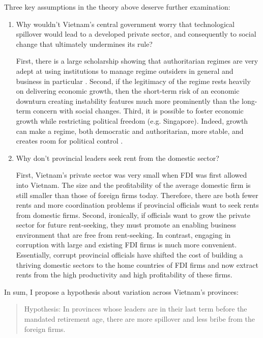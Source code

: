 Three key assumptions in the theory above deserve further examination:
\begin{enumerate}
\item Why wouldn't Vietnam's central government worry that technological spillover would lead to a developed private sector, and consequently to social change that ultimately undermines its rule?

First, there is a large scholarship showing that authoritarian regimes are very adept at using institutions to manage regime outsiders in general and business in particular \citep{Gandhi2006, Gandhi2008, Wright2008, Le2015}. Second, if the legitimacy of the regime rests heavily on delivering economic growth, then the short-term risk of an economic downturn creating instability features much more prominently than the long-term concern with social changes. Third, it is possible to foster economic growth while restricting political freedom (e.g. Singapore). Indeed, growth can make a regime, both democratic and authoritarian, more stable, and creates room for political control \citep{Przeworski1997}.

\item Why don't provincial leaders seek rent from the domestic sector? 

First, Vietnam's private sector was very small when FDI was first allowed into Vietnam. The size and the profitability of the average domestic firm is still smaller than those of foreign firms today. Therefore, there are both fewer rents and more coordination problems if provincial officials want to seek rents from domestic firms. Second, ironically, if officials want to grow the private sector for future rent-seeking, they must promote an enabling business environment that are free from rent-seeking. In contrast, engaging in corruption with large and existing FDI firms is much more convenient. Essentially, corrupt provincial officials have shifted the cost of building a thriving domestic sectors to the home countries of FDI firms and now extract rents from the high productivity and high profitability of these firms. 
\end{enumerate}

In sum, I propose a hypothesis about variation across Vietnam's provinces:

\begin{quote}
Hypothesis: In provinces whose leaders are in their last term before the mandated retirement age, there are more spillover and less bribe from the foreign firms.
\end{quote}
